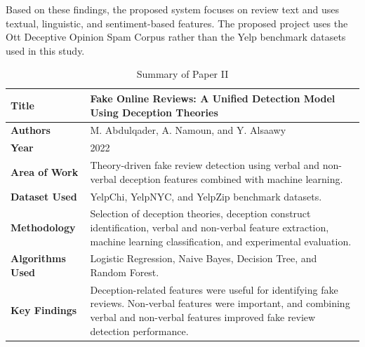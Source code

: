 \documentclass[12pt,a4paper]{report}
\begin{document}
Based on these findings, the proposed system focuses on review text and uses textual, linguistic, and sentiment-based features. The proposed project uses the Ott Deceptive Opinion Spam Corpus rather than the Yelp benchmark datasets used in this study.

\begin{table}[H]
\centering
\small
\renewcommand{\arraystretch}{1.3}

\begin{tabularx}{0.95\textwidth}{|>{\raggedright\arraybackslash}p{}|X|}
\hline
\textbf{Title} &
Fake Online Reviews: A Unified Detection Model Using Deception Theories \\
\hline

\textbf{Authors} &
M. Abdulqader, A. Namoun, and Y. Alsaawy \\
\hline

\textbf{Year} &
2022 \\
\hline

\textbf{Area of Work} &
Theory-driven fake review detection using verbal and non-verbal deception features combined with machine learning. \\
\hline

\textbf{Dataset Used} &
YelpChi, YelpNYC, and YelpZip benchmark datasets. \\
\hline

\textbf{Methodology} &
Selection of deception theories, deception construct identification, verbal and non-verbal feature extraction, machine learning classification, and experimental evaluation. \\
\hline

\textbf{Algorithms Used} &
Logistic Regression, Naive Bayes, Decision Tree, and Random Forest. \\
\hline

\textbf{Key Findings} &
Deception-related features were useful for identifying fake reviews. Non-verbal features were important, and combining verbal and non-verbal features improved fake review detection performance. \\
\hline

\end{tabularx}

\caption{Summary of Paper II}
\label{tab:paper2}
\end{table}


\newpage
\end{document}
